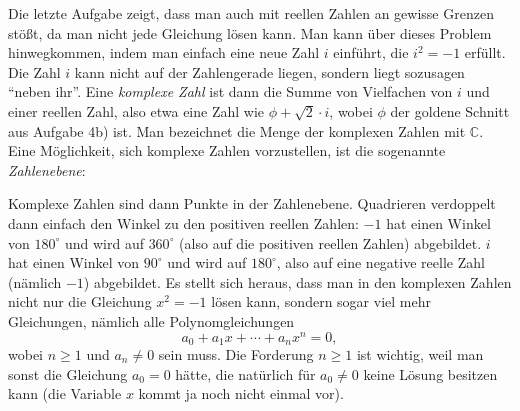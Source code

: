 \documentclass{zusammenfassung}
\begin{document}
Die letzte Aufgabe zeigt, dass man auch mit reellen Zahlen an gewisse Grenzen stößt, da man nicht jede Gleichung lösen kann. Man
kann über dieses Problem hinwegkommen, indem man einfach eine neue Zahl $i$ einführt, die $i^2=-1$ erfüllt. Die Zahl $i$ kann
nicht auf der Zahlengerade liegen, sondern liegt sozusagen "`neben ihr"'. Eine \emph{komplexe Zahl} ist dann die Summe von
Vielfachen von $i$ und einer reellen Zahl, also etwa eine Zahl wie $\phi+\sqrt 2\cdot i$, wobei $\phi$ der goldene Schnitt aus
Aufgabe 4b) ist. Man bezeichnet die Menge der komplexen Zahlen mit $\mathbb C$. Eine Möglichkeit, sich komplexe Zahlen
vorzustellen, ist die sogenannte \emph{Zahlenebene}:
\begin{center}
\end{center}

Komplexe Zahlen sind dann Punkte in der Zahlenebene. Quadrieren verdoppelt dann einfach den Winkel zu den positiven reellen
Zahlen: $-1$ hat einen Winkel von $180^\circ$ und wird auf $360^\circ$ (also auf die positiven reellen Zahlen) abgebildet. $i$ hat
einen Winkel von $90^\circ$ und wird auf $180^\circ$, also auf eine negative reelle Zahl (nämlich $-1$) abgebildet. Es stellt sich
heraus, dass man in den komplexen Zahlen nicht nur die Gleichung $x^2=-1$ lösen kann, sondern sogar viel mehr Gleichungen, nämlich
alle Polynomgleichungen
\[
	a_0+a_1x+\cdots+a_nx^n=0,
\]
wobei $n\geq 1$ und $a_n\neq 0$ sein muss. Die Forderung $n\geq 1$ ist wichtig, weil man sonst die Gleichung $a_0=0$ hätte, die
natürlich für $a_0\neq 0$ keine Lösung besitzen kann (die Variable $x$ kommt ja noch nicht einmal vor).
\end{document}
